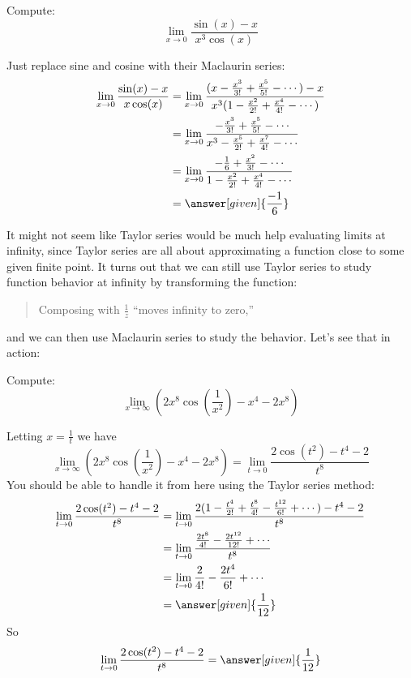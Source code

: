 \documentclass{ximera}
\begin{document}
\begin{example}
  Compute:
  \[
  \lim_{x \to 0} \frac{\sin(x)-x}{x^3\cos(x)} 
  \]
  \begin{explanation}
    Just replace sine and cosine with their Maclaurin series:
    \begin{align*}
      \lim_{x \to 0} \frac{\sin(x)-x}{x\cos(x)} &= \lim_{x \to 0} \frac{(x-\frac{x^3}{3!}+\frac{x^5}{5!}-\cdots)-x}{x^3(1-\frac{x^2}{2!}+\frac{x^4}{4!}-\cdots)}\\
      &= \lim_{x \to 0} \frac{-\frac{x^3}{3!}+\frac{x^5}{5!}-\cdots}{x^3 - \frac{x^5}{2!}+\frac{x^7}{4!}-\cdots}\\
      &=\lim_{x \to 0} \frac{-\frac{1}{6}+\frac{x^2}{3!}-\cdots}{1-\frac{x^2}{2!}+\frac{x^4}{4!}-\cdots}\\
      &=\answer[given]{\frac{-1}{6}}
    \end{align*}
  \end{explanation}
\end{example}

It might not seem like Taylor series would be much help evaluating
limits at infinity, since Taylor series are all about approximating a
function close to some given finite point.  It turns out that we can
still use Taylor series to study function behavior at infinity by
transforming the function:
\begin{quote}
  Composing with $\frac{1}{z}$ ``moves infinity to zero,''
\end{quote}
and we can then use Maclaurin series to study the behavior.  Let's see
that in action:

\begin{example}
  Compute:	
  \[
  \lim_{x \to \infty} \left(2x^8\cos\left(\frac{1}{x^2}\right) - x^4-2x^8\right)
  \]
  \begin{explanation}
    Letting $x=\frac{1}{t}$ we have
	\[
	\lim_{x \to \infty} \left(2x^8\cos\left(\frac{1}{x^2}\right) - x^4-2x^8\right)=\lim_{t \to 0} \frac{2\cos\left(t^2\right) - t^4-2}{t^8}
	\]
	You should be able to handle it from here using the Taylor
        series method:
	\begin{align*}
	  \lim_{t \to 0} \frac{2\cos(t^2) - t^4-2}{t^8} &= \lim_{t \to 0} \frac{2(1-\frac{t^4}{2!}+\frac{t^8}{4!}-\frac{t^{12}}{6!}+\cdots) - t^4-2}{t^8}\\
	  &=  \lim_{t \to 0} \frac{\frac{2t^8}{4!}-\frac{2t^{12}}{12!}+\cdots}{t^8}\\
	  &=\lim_{t \to 0} \frac{2}{4!}-\frac{2t^4}{6!} +\cdots\\
	  &=\answer[given]{\frac{1}{12}}
        \end{align*}
        So
	\[
	\lim_{t \to 0} \frac{2\cos(t^2) - t^4-2}{t^8} = \answer[given]{\frac{1}{12}}
	\]
  \end{explanation}	
\end{example}
\end{document}

